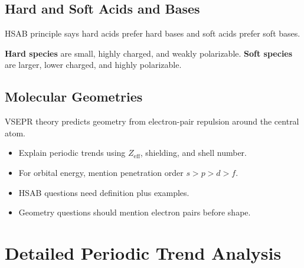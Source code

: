 \documentclass[12pt,a4paper]{article}
\begin{document}
\subsection{Hard and Soft Acids and Bases}
HSAB principle says hard acids prefer hard bases and soft acids prefer soft bases.

\begin{tcolorbox}[defbox]
\textbf{Hard species} are small, highly charged, and weakly polarizable. \textbf{Soft species} are larger, lower charged, and highly polarizable.
\end{tcolorbox}

\subsection{Molecular Geometries}
VSEPR theory predicts geometry from electron-pair repulsion around the central atom.

\begin{tcolorbox}[tikzbox, title={Common VSEPR Shapes}]
\centering
{}
\end{tcolorbox}

\begin{tcolorbox}[exambox, title={Exam Points}]
\begin{itemize}[leftmargin=*, itemsep=2pt, topsep=2pt]
  \item Explain periodic trends using $Z_{\mathrm{eff}}$, shielding, and shell number.
  \item For orbital energy, mention penetration order $s>p>d>f$.
  \item HSAB questions need definition plus examples.
  \item Geometry questions should mention electron pairs before shape.
\end{itemize}
\end{tcolorbox}

\section{Detailed Periodic Trend Analysis}
\end{document}
